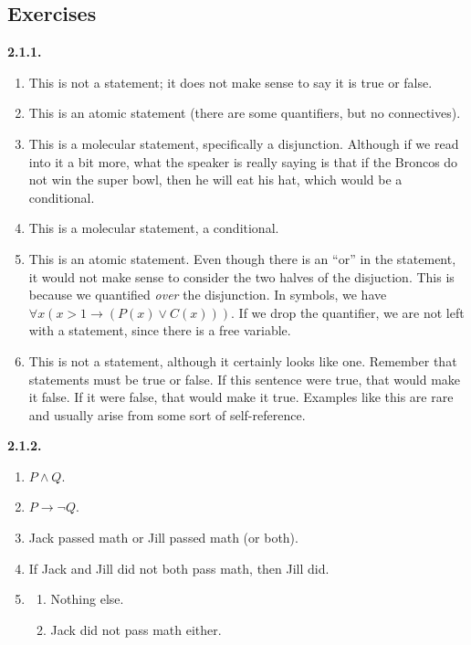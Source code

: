 \documentclass[12pt,]{book}
\theoremstyle{plain}
\theoremstyle{definition}
\theoremstyle{definition}
\theoremstyle{definition}
\numberwithin{equation}{chapter}
\newcommand{\imp}{\rightarrow}
\begin{document}
\subsection*{ Exercises}
\noindent\textbf{2.1.1.} \hypertarget{p-1129}{}%
\leavevmode%
\begin{enumerate}[label=(\alph*)]
\item\hypertarget{li-537}{}This is not a statement; it does not make sense to say it is true or false.%
\item\hypertarget{li-538}{}This is an atomic statement (there are some quantifiers, but no connectives).%
\item\hypertarget{li-539}{}This is a molecular statement, specifically a disjunction.  Although if we read into it a bit more, what the speaker is really saying is that if the Broncos do not win the super bowl, then he will eat his hat, which would be a conditional.%
\item\hypertarget{li-540}{}This is a molecular statement, a conditional.%
\item\hypertarget{li-541}{}This is an atomic statement.  Even though there is an ``or'' in the statement, it would not make sense to consider the two halves of the disjuction.  This is because we quantified \emph{over} the disjunction.  In symbols, we have \(\forall x (x > 1 \imp (P(x) \vee C(x)))\).  If we drop the quantifier, we are not left with a statement, since there is a free variable.%
\item\hypertarget{li-542}{}This is not a statement, although it certainly looks like one.  Remember that statements must be true or false.  If this sentence were true, that would make it false.  If it were false, that would make it true.  Examples like this are rare and usually arise from some sort of self-reference.%
\end{enumerate}
%
\par\smallskip
\noindent\textbf{2.1.2.} \hypertarget{p-1136}{}%
\leavevmode%
\begin{enumerate}[label=(\alph*)]
\item\hypertarget{li-550}{}\(P \wedge Q\).%
\item\hypertarget{li-551}{}\(P \imp \neg Q\).%
\item\hypertarget{li-552}{}\hypertarget{p-1137}{}%
Jack passed math or Jill passed math (or both).%
\item\hypertarget{li-553}{}\hypertarget{p-1138}{}%
If Jack and Jill did not both pass math, then Jill did.%
\item\hypertarget{li-554}{}\hypertarget{p-1139}{}%
%
\begin{enumerate}[label=\roman*.]
\item\hypertarget{li-555}{}Nothing else.%
\item\hypertarget{li-556}{}Jack did not pass math either.%
\end{enumerate}
%
\end{enumerate}
\end{document}
